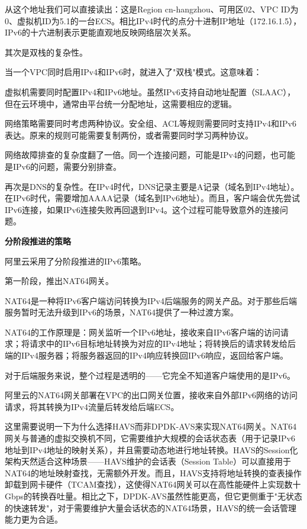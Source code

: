 从这个地址我们可以直接读出：这是Region cn-hangzhou、可用区02、VPC ID为0、虚拟机ID为5.1的一台ECS。相比IPv4时代的点分十进制IP地址（172.16.1.5），IPv6的十六进制表示更能直观地反映网络层次关系。

其次是双栈的复杂性。

当一个VPC同时启用IPv4和IPv6时，就进入了"双栈"模式。这意味着：

虚拟机需要同时配置IPv4和IPv6地址。虽然IPv6支持自动地址配置（SLAAC），但在云环境中，通常由平台统一分配地址，这需要相应的逻辑。

网络策略需要同时考虑两种协议。安全组、ACL等规则需要同时支持IPv4和IPv6表达。原来的规则可能需要复制两份，或者需要同时学习两种协议。

网络故障排查的复杂度翻了一倍。同一个连接问题，可能是IPv4的问题，也可能是IPv6的问题，需要分别排查。

再次是DNS的复杂性。在IPv4时代，DNS记录主要是A记录（域名到IPv4地址）。在IPv6时代，需要增加AAAA记录（域名到IPv6地址）。而且，客户端会优先尝试IPv6连接，如果IPv6连接失败再回退到IPv4。这个过程可能导致意外的连接问题。

\textbf{分阶段推进的策略}

阿里云采用了分阶段推进的IPv6策略。

第一阶段，推出NAT64网关。

NAT64是一种将IPv6客户端访问转换为IPv4后端服务的网关产品。对于那些后端服务暂时无法升级到IPv6的场景，NAT64提供了一种过渡方案。

NAT64的工作原理是：网关监听一个IPv6地址，接收来自IPv6客户端的访问请求；将请求中的IPv6目标地址转换为对应的IPv4地址；将转换后的请求转发给后端的IPv4服务器；将服务器返回的IPv4响应转换回IPv6响应，返回给客户端。

对于后端服务来说，整个过程是透明的——它完全不知道客户端使用的是IPv6。

阿里云的NAT64网关部署在VPC的出口网关位置，接收来自外部IPv6网络的访问请求，将其转换为IPv4流量后转发给后端ECS。

这里需要说明一下为什么选择HAVS而非DPDK-AVS来实现NAT64网关。NAT64网关与普通的虚拟交换机不同，它需要维护大规模的会话状态表（用于记录IPv6地址到IPv4地址的映射关系），并且需要动态地进行地址转换。HAVS的Session化架构天然适合这种场景——HAVS维护的会话表（Session Table）可以直接用于NAT64的地址映射查找，无需额外开发。而且，HAVS支持将地址转换的查表操作卸载到网卡硬件（TCAM查找），这使得NAT64网关可以在高性能硬件上实现数十Gbps的转换吞吐量。相比之下，DPDK-AVS虽然性能更高，但它更侧重于"无状态的快速转发"，对于需要维护大量会话状态的NAT64场景，HAVS的统一会话管理能力更为合适。


